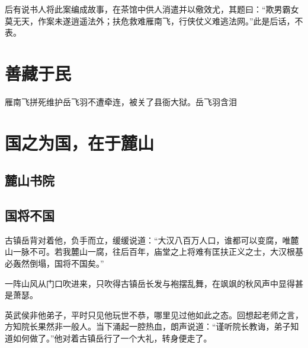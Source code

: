 后有说书人将此案编成故事，在茶馆中供人消遣并以儆效尤，其题曰：“欺男霸女莫无天，作案未遂逍遥法外；扶危救难雁南飞，行侠仗义难逃法网。”此是后话，不表。




\chapter{善藏于民}
雁南飞拼死维护岳飞羽不遭牵连，被关了县衙大狱。岳飞羽含泪

\section{}
\section{}
\section{}
\section{}



\chapter{国之为国，在于麓山}
\section{麓山书院}


\section{国将不国}
古镇岳背对着他，负手而立，缓缓说道：“大汉八百万人口，谁都可以变腐，唯麓山一脉不可。若我麓山一腐，往后百年，庙堂之上将难有匡扶正义之士，大汉根基必轰然倒塌，国将不国矣。”

一阵山风从门口吹进来，只吹得古镇岳长发与袍摆乱舞，在飒飒的秋风声中显得甚是萧瑟。

英武侯非他弟子，平时只见他玩世不恭，哪里见过他如此之态。回想起老师之言，方知院长果然非一般人。当下涌起一腔热血，朗声说道：“谨听院长教诲，弟子知道如何做了。”他对着古镇岳行了一个大礼，转身便走了。

\section{}
\section{}

